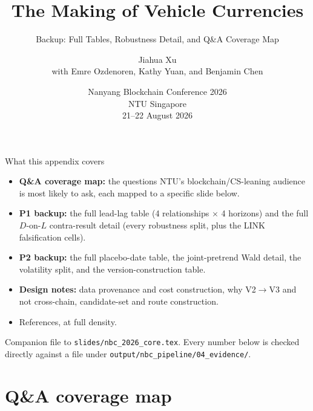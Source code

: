 \documentclass[aspectratio=169]{beamer}
\title[Vehicle Currencies in DeFi -- Backup]{The Making of Vehicle Currencies}
\subtitle{Backup: Full Tables, Robustness Detail, and Q\&A Coverage Map}
\author[J.~Xu et al.]{Jiahua Xu \\ {\small with Emre Ozdenoren, Kathy Yuan, and Benjamin Chen}}
\institute{UCL Centre for Blockchain Technologies}
\date{Nanyang Blockchain Conference 2026 \\ NTU Singapore \\ 21--22 August 2026}
\begin{document}
\begin{frame}
  \titlepage
\end{frame}

\begin{frame}{What this appendix covers}
  \begin{itemize}
    \item \textbf{Q\&A coverage map:} the questions NTU's blockchain/CS-leaning audience is most likely to ask, each mapped to a specific slide below.
    \item \textbf{P1 backup:} the full lead-lag table (4 relationships $\times$ 4 horizons) and the full $D$-on-$L$ contra-result detail (every robustness split, plus the LINK falsification cells).
    \item \textbf{P2 backup:} the full placebo-date table, the joint-pretrend Wald detail, the volatility split, and the version-construction table.
    \item \textbf{Design notes:} data provenance and cost construction, why V2$\to$V3 and not cross-chain, candidate-set and route construction.
    \item References, at full density.
  \end{itemize}
  {\scriptsize Companion file to \texttt{slides/nbc\_2026\_core.tex}. Every number below is checked directly against a file under \texttt{output/nbc\_pipeline/04\_evidence/}.}
\end{frame}

\section{Q\&A coverage map}
\end{document}
